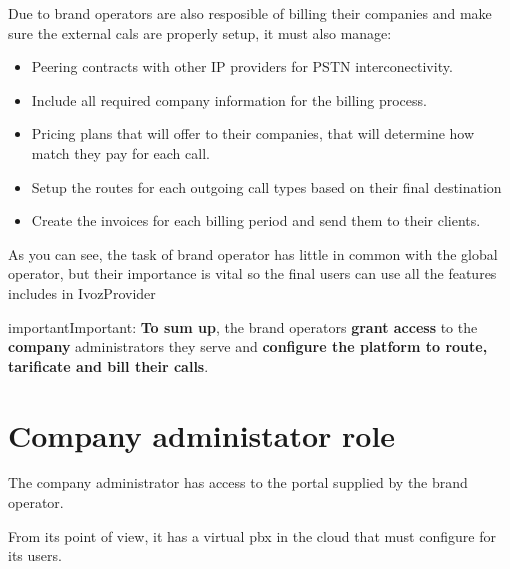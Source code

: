 \documentclass[letterpaper,10pt,english]{sphinxmanual}
\begin{document}
Due to brand operators are also resposible of billing their companies and
make sure the external cals are properly setup, it must also manage:
\begin{itemize}
\item {} 
Peering contracts with other IP providers for PSTN interconectivity.

\item {} 
Include all required company information for the billing process.

\item {} 
Pricing plans that will offer to their companies, that will determine how
match they pay for each call.

\item {} 
Setup the routes for each outgoing call types based on their final
destination

\item {} 
Create the invoices for each billing period and send them to their
clients.

\end{itemize}

As you can see, the task of brand operator has little in common with the
global operator, but their importance is vital so the final users can use
all the features includes in IvozProvider
\label{basics/operation_roles/index:brand-responsibilities}
\begin{notice}{important}{Important:}
\textbf{To sum up}, the brand operators \textbf{grant access} to the
\textbf{company} administrators they serve and \textbf{configure the
platform to route, tarificate and bill their calls}.
\end{notice}


\section{Company administator role}
\label{basics/operation_roles/index:company-administator-role}
The company administrator has access to the portal supplied by the brand
operator.

From its point of view, it has a virtual pbx in the cloud that must
configure for its users.
\end{document}
